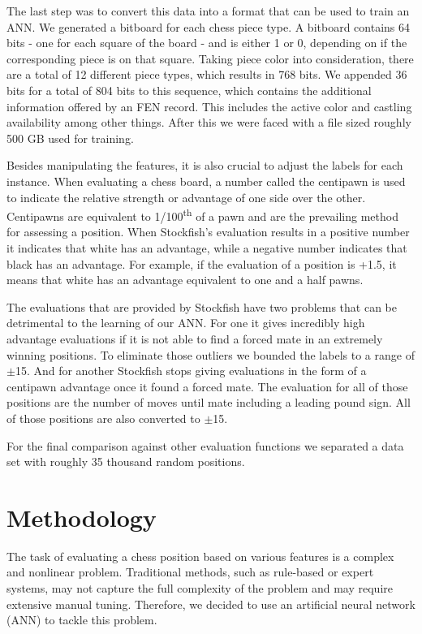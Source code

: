 \documentclass[conference]{IEEEtran}
\begin{document}
The last step was to convert this data into a format that can be used to train an ANN. We generated a bitboard for each chess piece type. A bitboard contains 64 bits - one for each square of the board - and is either 1 or 0, depending on if the corresponding piece is on that square. Taking piece color into consideration, there are a total of 12 different piece types, which results in 768 bits. We appended 36 bits for a total of 804 bits to this sequence, which contains the additional information offered by an FEN record. This includes the active color and castling availability among other things. After this we were faced with a file sized roughly 500 GB used for training.

Besides manipulating the features, it is also crucial to adjust the labels for each instance. When evaluating a chess board, a number called the centipawn is used to indicate the relative strength or advantage of one side over the other. Centipawns are equivalent to 1/100\textsuperscript{th} of a pawn and are the prevailing method for assessing a position. When Stockfish's evaluation results in a positive number it indicates that white has an advantage, while a negative number indicates that black has an advantage. For example, if the evaluation of a position is +1.5, it means that white has an advantage equivalent to one and a half pawns.

The evaluations that are provided by Stockfish have two problems that can be detrimental to the learning of our ANN. For one it gives incredibly high advantage evaluations if it is not able to find a forced mate in an extremely winning positions. To eliminate those outliers we bounded the labels to a range of $\pm$15. And for another Stockfish stops giving evaluations in the form of a centipawn advantage once it found a forced mate. The evaluation for all of those positions are the number of moves until mate including a leading pound sign. All of those positions are also converted to $\pm$15.

For the final comparison against other evaluation functions we separated a data set with roughly 35 thousand random positions.

\section{Methodology}\label{methodology}
The task of evaluating a chess position based on various features is a complex and nonlinear problem. Traditional methods, such as rule-based or expert systems, may not capture the full complexity of the problem and may require extensive manual tuning. Therefore, we decided to use an artificial neural network (ANN) to tackle this problem.
\end{document}
